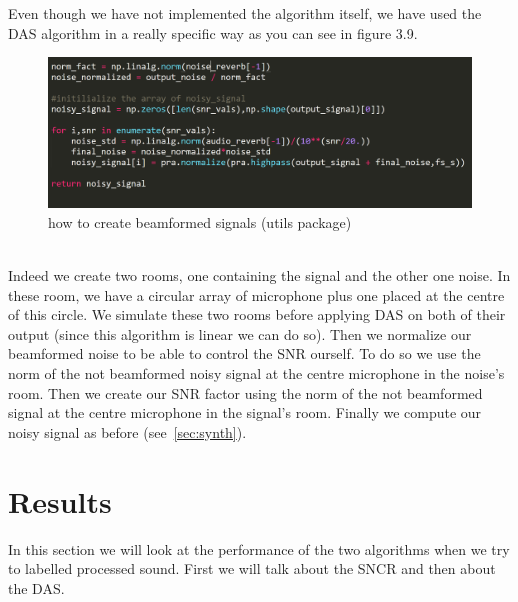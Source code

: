 \documentclass[11pt,a4paper,titlepage]{report}
\begin{document}
\hspace*{0.6cm}
Even though we have not implemented the algorithm itself, we have used the DAS algorithm in a really specific way as you can see in figure 3.9.\\
\begin{figure}[h!]
	\centering
	\includegraphics[width=0.7\linewidth]{rapport14}
	\caption{how to create beamformed signals (utils package)}
	\label{fig:rapport13}
\end{figure}\\
Indeed we create two rooms, one containing the signal and the other one noise. In these room, we have a circular array of microphone plus one placed at the centre of this circle. We simulate these two rooms before applying DAS on both of their output (since this algorithm is linear we can do so). Then we normalize our beamformed noise to be able to control the SNR ourself. To do so we use the norm of the not beamformed noisy signal at the centre microphone in the noise's room. Then we create our SNR factor using the norm of the not beamformed signal at the centre microphone in the signal's room. Finally we compute our noisy signal as before (see~\ref{sec:synth}).


\chapter{Results}
\hspace*{0.6cm}
In this section we will look at the performance of the two algorithms when we try to labelled processed sound. First we will talk about the SNCR and then about the DAS.
\end{document}
